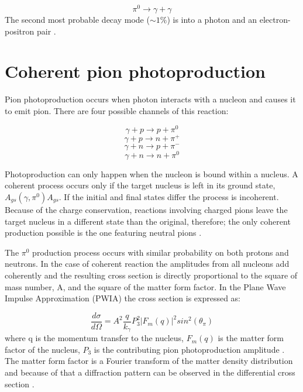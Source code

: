 \begin{equation}
\pi^{0} \rightarrow \gamma + \gamma
\end{equation}
The second most probable decay mode ($\sim1\%$) is into a photon and an electron-positron pair \cite{amsler}.

\section{Coherent pion photoproduction}

\indent Pion photoproduction occurs when photon interacts with a nucleon and causes it to emit pion. There are four possible channels of this reaction:

\begin{equation}
\gamma + p \rightarrow p + \pi^{0}
\end{equation}
\begin{equation}
\gamma + p \rightarrow n + \pi^{+}
\end{equation}
\begin{equation}
\gamma + n \rightarrow p + \pi^{-}
\end{equation}
\begin{equation}
\gamma + n \rightarrow n + \pi^{0}
\end{equation}

Photoproduction can only happen when the nucleon is bound within a nucleus. A coherent process occurs only if the target nucleus is left in its ground state, $A_{gs}(\gamma,\pi^{0})A_{gs}$. If the initial and final states differ the process is incoherent. Because of the charge conservation, reactions involving charged pions leave the target nucleus in a different state than the original, therefore; the only coherent production possible is the one featuring neutral pions \cite{claire}.

\indent The $\pi^{0}$ production process occurs with similar probability on both protons and neutrons. In the case of coherent reaction the amplitudes from all nucleons add coherently and the resulting cross section is directly proportional to the square of mass number, A, and the square of the matter form factor. In the Plane Wave Impulse Approximation (PWIA) the cross section is expressed as:

\begin{equation}
\frac{d\sigma}{d\Omega}=A^{2} \frac{q}{k_{\gamma}} P^{2}_{3} |F_{m}(q)|^{2} sin^{2}(\theta_{\pi})
\end{equation}
where q is the momentum transfer to the nucleus, $F_{m}(q)$ is the matter form factor of the nucleus, $P_{3}$ is the contributing pion photoproduction amplitude \cite{Proposal}. The matter form factor is a Fourier transform of the matter density distribution and because of that a diffraction pattern can be observed in the differential cross section \cite{claire}.

